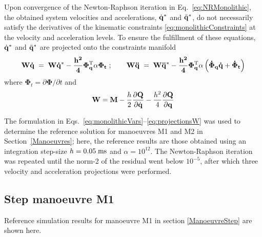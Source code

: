 \documentclass[fleqn,11pt]{article}
\newcommand{\unit}[1]		{ {\; \rm #1} }
\newcommand{\plbr}[1]{ \left( #1 \right) }
\newcommand{\partialD}[2]{ \dfrac{\partial #1}{\partial #2}}
\newcommand{\trans}		{ ^{\rm T} }
\newcommand{\eq}		{ {\;=\;} }
\newcommand{\pos}		{ {\bf{q}} }
\newcommand{\vel}		{ {{\dot{\bf{q}}}} }
\newcommand{\acc}		{ {\ddot{\bf{q}}} }
\newcommand{\Mass}		{ {\bf{M}} }
\newcommand{\ctr}		{ {\bm \Phi} }
\newcommand{\ctrJac}	{ {\bm \Phi}_{\pos} }
\newcommand{\ctrJacd}	{ {\dot{\bm \Phi}}_{\pos} }
\newcommand{\fgen}		{ {\bf Q} }
\begin{document}
Upon convergence of the Newton-Raphson iteration in Eq.~\eqref{eq:NRMonolithic}, the obtained system velocities and accelerations, $\vel^{*}$ and $\acc^{*}$, do not necessarily satisfy the derivatives of the kinematic constraints \eqref{eq:monolithicConstraints} at the velocity and acceleration levels.
To ensure the fulfillment of these equations, $\vel^{*}$ and $\acc^{*}$ are projected onto the constraints manifold \cite{Naya2011}
\begin{equation}
	\bf W \vel \; =\; {\bf W}\vel^{*} - \dfrac{h^2}{4} \ctrJac\trans \alpha \ctr_t
	\;; \quad\quad
	\bf W \acc \; =\; {\bf W}\acc^{*} - \dfrac{h^2}{4} \ctrJac\trans\alpha\plbr{\ctrJacd\vel + \dot{\ctr}_t}
	\label{eq:monolithicProjections}
\end{equation}
where $\ctr_t = \partial\ctr/\partial t$ and
\begin{equation}
	{\bf W} \eq \Mass - \dfrac{h}{2}\partialD{\fgen}{\vel} - \dfrac{h^2}{4}\partialD{\fgen}{\pos}
	\label{eq:projectionsW}
\end{equation}


The formulation in Eqs.~\eqref{eq:monolithicVars}--\eqref{eq:projectionsW} was used to determine the reference solution for manoeuvres M1 and M2 in Section~\ref{Manoeuvres}; here, the reference results are those obtained using an integration step-size $h=0.05\unit{ms}$ and $\alpha = 10^{12}$.
The Newton-Raphson iteration was repeated until the norm-2 of the residual went below $10^{-5}$, after which three velocity and acceleration projections were performed.

\subsection{Step manoeuvre M1}
\label{ReferenceSolutionM1}

Reference simulation results for manoeuvre M1 in section \ref{ManoeuvreStep} are shown here.
\end{document}
